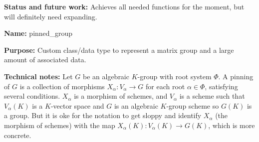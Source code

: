\documentclass[12pt]{article}
\newcommand{\tbf}{\textbf}
\begin{document}
\begin{mdframed}[linecolor=red]
\tbf{Status and future work:} Achieves all needed functions for the moment, but will definitely need expanding.
\end{mdframed}

\begin{mdframed}[linecolor=red]
\tbf{Name:} pinned\_group

\smallskip

\tbf{Purpose:} Custom class/data type to represent a matrix group and a large amount of associated data.

\smallskip

\tbf{Technical notes:} Let $G$ be an algebraic $K$-group with root system $\Phi$. A pinning of $G$ is a collection of morphisms $X_\alpha:V_\alpha \to G$ for each root $\alpha \in \Phi$, satisfying several conditions. $X_\alpha$ is a morphism of schemes, and $V_\alpha$ is a scheme such that $V_\alpha(K)$ is a $K$-vector space and $G$ is an algebraic $K$-group scheme so $G(K)$ is a group. But it is oke for the notation to get sloppy and identify $X_\alpha$ (the morphism of schemes) with the map $X_\alpha(K):V_\alpha(K) \to G(K)$, which is more concrete. 


\end{mdframed}
\end{document}
